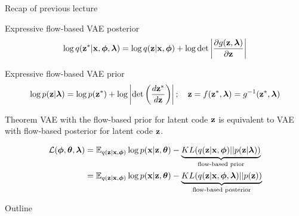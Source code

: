 \begin{frame}{Recap of previous lecture}
	\begin{block}{Expressive flow-based VAE posterior}
		\vspace{-0.3cm}
		\[
			\log q(\mathbf{z}^* | \mathbf{x}, \boldsymbol{\phi}, \boldsymbol{\lambda}) = \log q(\mathbf{z} | \mathbf{x}, \boldsymbol{\phi}) + \log \det \left | \frac{\partial g(\mathbf{z}, \boldsymbol{\lambda})}{\partial \mathbf{z}}\right|
		\]
		\vspace{-0.5cm}
	\end{block}
	\begin{block}{Expressive flow-based VAE prior}
		\vspace{-0.5cm}
		\[
			\log p(\mathbf{z} | \boldsymbol{\lambda}) = \log p(\mathbf{z}^*) + \log \left | \det \left(\frac{d \mathbf{z}^*}{d\mathbf{z}}\right)\right|; \quad 
			\mathbf{z} = f(\mathbf{z}^*, \boldsymbol{\lambda}) = g^{-1}(\mathbf{z}^*, \boldsymbol{\lambda})
		\]
	\end{block}
	\vspace{-0.6cm}
	\begin{block}{Theorem}
	VAE with the flow-based prior for latent code $\mathbf{z}$ is equivalent to VAE with flow-based posterior for latent code $\mathbf{z}$.
	\end{block}
	\vspace{-0.6cm}
	\begin{align*}
		\mathcal{L}(\boldsymbol{\phi}, \boldsymbol{\theta}, \boldsymbol{\lambda}) &= \mathbb{E}_{q(\mathbf{z} | \mathbf{x}, \boldsymbol{\phi})} \log p(\mathbf{x} | \mathbf{z}, \boldsymbol{\theta}) - \underbrace{KL( q(\mathbf{z} | \mathbf{x}, \boldsymbol{\phi}) || p(\mathbf{z} | \boldsymbol{\lambda}))}_{\text{flow-based prior}} \\
		& = \mathbb{E}_{q(\mathbf{z} | \mathbf{x}, \boldsymbol{\phi})} \log p(\mathbf{x} | \mathbf{z}, \boldsymbol{\theta}) - \underbrace{KL( q(\mathbf{z} | \mathbf{x}, \boldsymbol{\phi}, \boldsymbol{\lambda}) || p(\mathbf{z}))}_{\text{flow-based posterior}}
	\end{align*}
\end{frame}
\begin{frame}{Outline}
	\tableofcontents
\end{frame}
